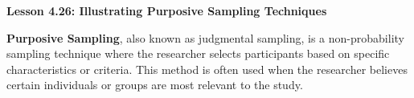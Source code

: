 \begin{center}
\textbf{Lesson 4.26: Illustrating Purposive Sampling Techniques}
\end{center}

\vspace*{-1.5ex}

\noindent \textbf{Purposive Sampling}, also known as judgmental sampling, is a non-probability sampling technique where the researcher selects participants based on specific characteristics or criteria. This method is often used when the researcher believes certain individuals or groups are most relevant to the study.


